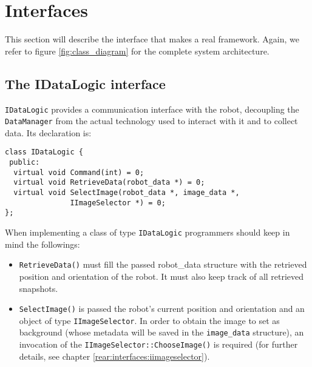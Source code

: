 \section{Interfaces}
\label{rear:interfaces}

This section will describe the interface that
makes \framework{} a real framework. Again, we refer
to figure
\ref{fig:class_diagram} for the complete system
architecture.

\subsection{The IDataLogic interface}
\label{rear:interfaces:idatalogic}

\texttt{IDataLogic} provides a communication interface 
with the robot, decoupling the \texttt{DataManager} 
from the actual technology used to interact with it 
and to collect data. Its declaration is:
\\ 
\begin{lstlisting}[caption={\texttt{IDataLogic} declaration}, label={code:idatalogic}]
class IDataLogic {
 public:
  virtual void Command(int) = 0;
  virtual void RetrieveData(robot_data *) = 0;
  virtual void SelectImage(robot_data *, image_data *,
			   IImageSelector *) = 0;
};
\end{lstlisting}

When implementing a class of type \texttt{IDataLogic}
programmers should keep in mind the followings:

\begin{itemize}
  \item \texttt{RetrieveData()} must fill the passed 
    robot\_data structure with the retrieved position and
    orientation of the robot. It must also keep track of 
    all retrieved snapshots.
  \item \texttt{SelectImage()} is passed the robot's current 
    position and orientation and an object of type 
    \texttt{IImageSelector}. In order to obtain the image 
    to set as background (whose metadata will be saved 
    in the \texttt{image\_data} structure), an 
    invocation of the \texttt{IImageSelector::ChooseImage()}
    is required (for further details, see chapter
    \ref{rear:interfaces:iimageselector}).
\end{itemize}


